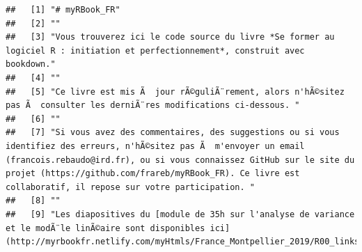 \documentclass[]{book}
\begin{document}
\begin{verbatim}
##   [1] "# myRBook_FR"                                                                                                                                                                                                                                                                                               
##   [2] ""                                                                                                                                                                                                                                                                                                           
##   [3] "Vous trouverez ici le code source du livre *Se former au logiciel R : initiation et perfectionnement*, construit avec bookdown."                                                                                                                                                                            
##   [4] ""                                                                                                                                                                                                                                                                                                           
##   [5] "Ce livre est mis Ã  jour rÃ©guliÃ¨rement, alors n'hÃ©sitez pas Ã  consulter les derniÃ¨res modifications ci-dessous. "                                                                                                                                                                                      
##   [6] ""                                                                                                                                                                                                                                                                                                           
##   [7] "Si vous avez des commentaires, des suggestions ou si vous identifiez des erreurs, n'hÃ©sitez pas Ã  m'envoyer un email (francois.rebaudo@ird.fr), ou si vous connaissez GitHub sur le site du projet (https://github.com/frareb/myRBook_FR). Ce livre est collaboratif, il repose sur votre participation. "
##   [8] ""                                                                                                                                                                                                                                                                                                           
##   [9] "Les diapositives du [module de 35h sur l'analyse de variance et le modÃ¨le linÃ©aire sont disponibles ici](http://myrbookfr.netlify.com/myHtmls/France_Montpellier_2019/R00_links.html)."                                                                                                                   

\end{verbatim}
\end{document}

